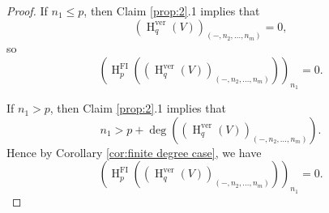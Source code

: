 \documentclass[10pt,a4paper]{amsart}
\DeclareMathOperator{\HH}{H}
\newcommand{\FI}{{\mathrm{FI}}}
\newcommand{\ver}{{\mathrm{ver}}}
\begin{document}
\begin{proof}
      If $n_1 \leqslant p$, then Claim \ref{prop:2}.1 implies that 
      \[ (\HH^\ver_q(V))_{(-, n_2, \ldots, n_m)} = 0, \] 
      so 
      \[ (\HH^{\FI}_p( (\HH^\ver_q (V) )_{(-, n_2, \ldots, n_m)}  ))_{n_1} = 0. \]

      If $n_1 > p$, then Claim \ref{prop:2}.1 implies that 
      \[ n_1 > p + \deg\left( (\HH^\ver_q(V))_{(-, n_2, \ldots, n_m)} \right). \]
      Hence by Corollary \ref{cor:finite degree case}, we have 
      \[ (\HH^{\FI}_p((\HH^\ver_q(V))_{(-, n_2, \ldots, n_m)}))_{n_1} = 0. \] 
\end{proof}
\end{document}
